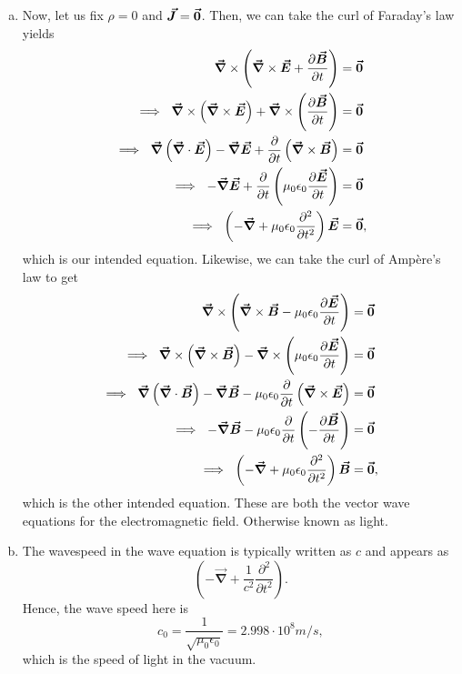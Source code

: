 \documentclass[12pt]{article} %
\newcommand{\grad}{\boldsymbol{\vec{\nabla}}}
\newcommand{\vecfieldE}{\boldsymbol{\vec{E}}}
\newcommand{\vecfieldB}{\boldsymbol{\vec{B}}}
\newcommand{\vecfieldJ}{\boldsymbol{\vec{J}}}
\newcommand{\veclaplace}{\boldsymbol{\vec{\nabla}}}
\begin{document}
\begin{solution}
\begin{enumerate}[(a)]
    \item Now, let us fix $\rho=0$ and $\vecfieldJ=\zerovec$.  Then, we can take the curl of Faraday's law yields
        \begin{align*}
            \grad \times \left(\grad \times \vecfieldE +  \frac{\partial \vecfieldB}{\partial t} \right) &=\zerovec\\
            \implies ~ \grad \times \left(\grad \times \vecfieldE\right) + \grad \times \left(\frac{\partial \vecfieldB}{\partial t} \right)&=\zerovec \\
            \implies ~ \grad \left( \grad \cdot \vecfieldE\right)-\veclaplace \vecfieldE + \frac{\partial}{\partial t} \left( \grad \times \vecfieldB\right)&=\zerovec\\
            \implies ~ -\veclaplace \vecfieldE +  \frac{\partial}{\partial t} \left(\mu_0 \epsilon_0 \frac{\partial \vecfieldE}{\partial t}\right) &= \zerovec\\
            \implies ~ \left( - \veclaplace + \mu_0 \epsilon_0 \frac{\partial^2 }{\partial t^2}\right) \vecfieldE &= \zerovec,
        \end{align*}
        which is our intended equation.  Likewise, we can take the curl of Amp\`ere's law to get
    \begin{align*}
        \grad \times \left(\grad \times \vecfieldB - \mu_0 \epsilon_0 \frac{\partial \vecfieldE}{\partial t} \right) &=\zerovec\\
        \implies ~ \grad \times \left(\grad \times \vecfieldB\right) - \grad \times \left(\mu_0 \epsilon_0\frac{\partial \vecfieldE}{\partial t} \right)&=\zerovec \\
        \implies ~ \grad \left( \grad \cdot \vecfieldB\right)-\veclaplace \vecfieldB - \mu_0\epsilon_0\frac{\partial}{\partial t} \left( \grad \times \vecfieldE\right)&=\zerovec\\
        \implies ~ -\veclaplace \vecfieldB - \mu_0 \epsilon_0 \frac{\partial}{\partial t} \left(-\frac{\partial \vecfieldB}{\partial t}\right) &= \zerovec\\
        \implies ~ \left( - \veclaplace + \mu_0 \epsilon_0 \frac{\partial^2 }{\partial t^2}\right) \vecfieldB &= \zerovec,
    \end{align*}
    which is the other intended equation. These are both the vector wave equations for the electromagnetic field. Otherwise known as light.
    
    \item The wavespeed in the wave equation is typically written as $c$ and appears as
    \[
    \left( - \veclaplace + \frac{1}{c^2} \frac{\partial^2 }{\partial t^2}\right).
    \]
    Hence, the wave speed here is
    \[
    c_0 = \frac{1}{\sqrt{\mu_0\epsilon_0}} = 2.998 \cdot 10^8 m/s,
    \]
    which is the speed of light in the vacuum.
\end{enumerate}
\end{solution}
\end{document}
